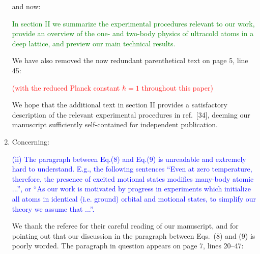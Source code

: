 \documentclass[preprint]{revtex4-1}
\newcommand{\1}{\mathds{1}}
\newcommand{\blue}[1]{\textcolor{blue}{#1}}
\newcommand{\red}[1]{\textcolor{red}{#1}}
\newcommand{\green}[1]{\textcolor{green}{#1}}
\begin{document}
\begin{enumerate}
  and now:

  \green{In section II we summarize the experimental procedures
    relevant to our work, provide an overview of the one- and two-body
    physics of ultracold atoms in a deep lattice, and preview our main
    technical results.}

  We have also removed the now redundant parenthetical text on page 5,
  line 45:

  \red{(with the reduced Planck constant $\hbar=1$ throughout this
    paper)}

  We hope that the additional text in section II provides a
  satisfactory description of the relevant experimental procedures in
  ref.~[34], deeming our manuscript sufficiently self-contained for
  independent publication.


\item Concerning:

  \blue{(ii) The paragraph between Eq.(8) and Eq.(9) is unreadable and
    extremely hard to understand. E.g., the following sentences ``Even
    at zero temperature, therefore, the presence of excited motional
    states modifies many-body atomic ...'', or ``As our work is
    motivated by progress in experiments which initialize all atoms in
    identical (i.e. ground) orbital and motional states, to simplify
    our theory we assume that ...''.}

  \label{pt:confusion}

  We thank the referee for their careful reading of our manuscript,
  and for pointing out that our discussion in the paragraph between
  Eqs.~(8) and (9) is poorly worded.  The paragraph in question
  appears on page 7, lines 20--47:


\end{enumerate}
\end{document}
